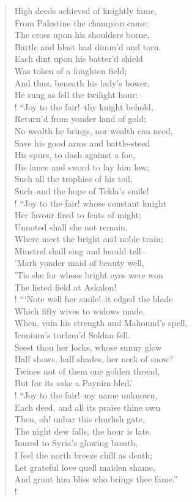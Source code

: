 \begin{verse}
High deeds achieved of knightly fame,\\
From Palestine the champion came;\\
The cross upon his shoulders borne,\\
Battle and blast had dimm'd and torn.\\
Each dint upon his batter'd shield\\
Was token of a foughten field;\\
And thus, beneath his lady's bower,\\
He sung as fell the twilight hour:--\\!
``Joy to the fair!--thy knight behold,\\
Return'd from yonder land of gold;\\
No wealth he brings, nor wealth can need,\\
Save his good arms and battle-steed\\
His spurs, to dash against a foe,\\
His lance and sword to lay him low;\\
Such all the trophies of his toil,\\
Such--and the hope of Tekla's smile!\\!
``Joy to the fair! whose constant knight\\
Her favour fired to feats of might;\\
Unnoted shall she not remain,\\
Where meet the bright and noble train;\\
Minstrel shall sing and herald tell--\\
'Mark yonder maid of beauty well,\\
'Tis she for whose bright eyes were won\\
The listed field at Askalon!\\!
```Note well her smile!--it edged the blade\\
Which fifty wives to widows made,\\
When, vain his strength and Mahound's spell,\\
Iconium's turban'd Soldan fell.\\
Seest thou her locks, whose sunny glow\\
Half shows, half shades, her neck of snow?\\
Twines not of them one golden thread,\\
But for its sake a Paynim bled.'\\!
``Joy to the fair!--my name unknown,\\
Each deed, and all its praise thine own\\
Then, oh! unbar this churlish gate,\\
The night dew falls, the hour is late.\\
Inured to Syria's glowing breath,\\
I feel the north breeze chill as death;\\
Let grateful love quell maiden shame,\\
And grant him bliss who brings thee fame.''\\!
\end{verse}


